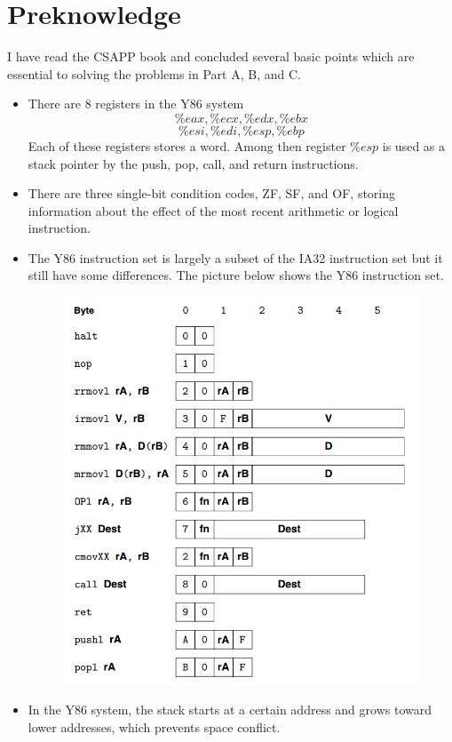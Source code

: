 \documentclass[12pt,a4paper]{article}
\theoremstyle{definition}
\numberwithin{equation}{section}
\numberwithin{figure}{section}
\begin{document}
\section{Preknowledge}
I have read the CSAPP book and concluded several basic points which are essential to solving the problems in Part A, B, and C.
\begin{itemize}
	\item There are 8 registers in the Y86 system
	$$\%eax, \%ecx, \%edx, \%ebx$$
	$$\%esi, \%edi, \%esp, \%ebp$$
	Each of these registers stores a word. Among then register $\%esp$ is used as a stack pointer by the push, pop, call, and return instructions.
	\item There are three single-bit condition codes, ZF, SF, and OF, storing information about the effect of the most recent arithmetic or logical instruction.
	\item The Y86 instruction set is largely a subset of the IA32 instruction set but it still have some differences. The picture below shows the Y86 instruction set.
	\begin{figure}[H]
		\centering
		\includegraphics[width=12cm]{instruction.jpg}
	\end{figure}
	\item In the Y86 system, the stack starts at a certain address and grows toward lower addresses, which prevents space conflict.
\end{itemize}
\newpage
\end{document}
